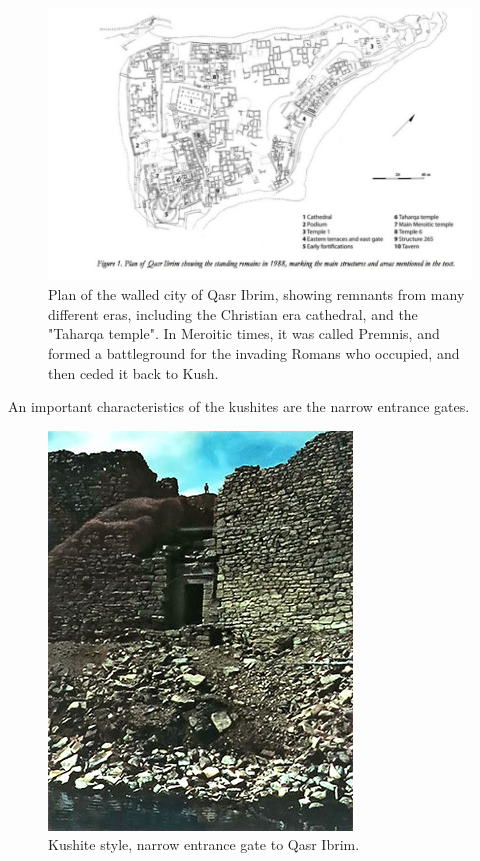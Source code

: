 \documentclass[a4paper,12pt]{scrreprt}
\begin{document}
\begin{figure}[H]
	\centering
	\includegraphics[width=\textwidth]{img/walls_gates/qasr_ibrim_walled_city}
	\caption{Plan of the walled city of Qasr Ibrim, showing remnants from many different eras, including the Christian era cathedral, and the "Taharqa temple". In Meroitic times, it was called Premnis, and formed a battleground for the invading Romans who occupied, and then ceded it back to Kush.}
\end{figure}

An important characteristics of the kushites are the narrow entrance gates.

\begin{figure}[H]
	\centering
	\includegraphics[width=\textwidth]{img/walls_gates/qasr_ibrim_gate}
	\caption{Kushite style, narrow entrance gate to Qasr Ibrim.}
\end{figure}
\end{document}

